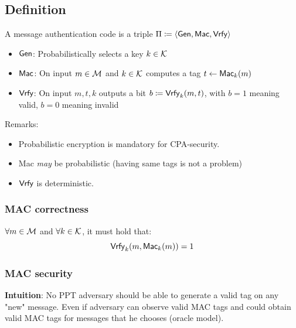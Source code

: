 \documentclass[12pt]{article}
\begin{document}
\subsection{Definition}
A message authentication code is a triple $\Pi \coloneqq \langle \operatorname{\mathsf{Gen}}, \operatorname{\mathsf{Mac}}, \operatorname{\mathsf{Vrfy}} \rangle$
\begin{itemize}
\item $\operatorname{\mathsf{Gen}}$: Probabilistically selects a key $k \in \mathcal{K}$
\item $\operatorname{\mathsf{Mac}}$: On input $m \in \mathcal{M}$ and $k \in \mathcal{K}$ computes a tag $t\leftarrow \operatorname{\mathsf{Mac}}_k(m)$
\item $\operatorname{\mathsf{Vrfy}}$: On input $m,t,k$ outputs a bit $b \coloneqq \operatorname{\mathsf{Vrfy}}_k(m,t)$, with $b=1$ meaning valid, $b=0$ meaning invalid
\end{itemize}

Remarks:
\begin{itemize}
\item Probabilistic encryption is mandatory for CPA-security.
\item Mac \emph{may} be probabilistic (having same tags is not a problem)
\item $\operatorname{\mathsf{Vrfy}}$ is deterministic. 
\end{itemize}

\subsubsection{MAC correctness}
$\forall m \in \mathcal{M}$ and $\forall k \in \mathcal{K}$, it must hold that:
\begin{equation*}
\operatorname{\mathsf{Vrfy}}_k(m,\operatorname{\mathsf{Mac}}_k(m))=1
\end{equation*}

\subsubsection{MAC security}
\textbf{Intuition}: No PPT adversary should be able to generate a valid tag on any "new" message. Even if adversary can observe valid MAC tags and could obtain valid MAC tags for messages that he chooses (oracle model).
\end{document}
